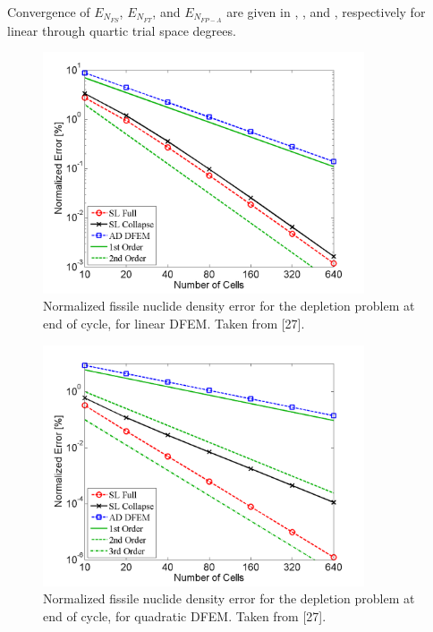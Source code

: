 Convergence of $E_{N_{FS}}$, $E_{N_{FT}}$, and $E_{N_{FP-A}}$ are given in 
, , and , respectively for linear through quartic trial space degrees.

\begin{figure}[!htp]
\centering
\includegraphics[width=9.5cm]{chapter5_depletion/FS_P1_norm_err.png}
\caption{Normalized fissile nuclide density error for the depletion problem at end of cycle, for linear DFEM.  Taken from [27].}
\label{fig:depletion_NFS_p1}
\end{figure}

\begin{figure}[!hbp]
\centering
\includegraphics[width=9.5cm]{chapter5_depletion/FS_P2_norm_err.png}
\caption{Normalized fissile nuclide density error for the depletion problem at end of cycle, for quadratic DFEM.  Taken from [27].}
\label{fig:depletion_NFS_p2}
\end{figure}

